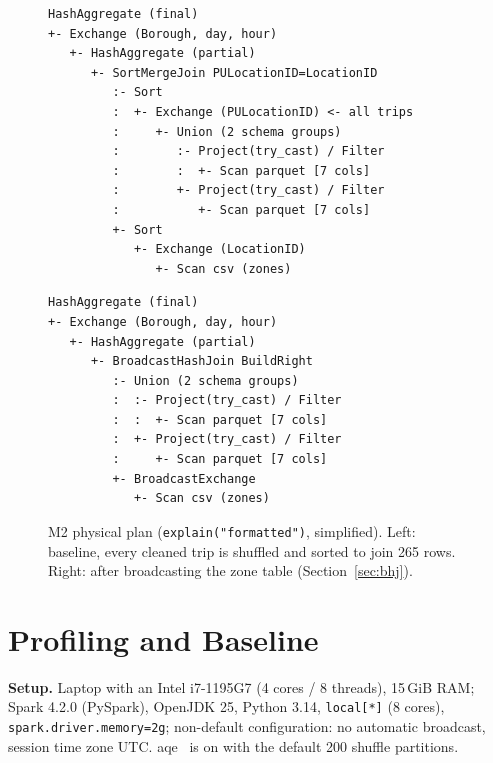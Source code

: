 \documentclass[sigconf]{acmart}
\begin{document}
\begin{figure}[t]
      \centering
      \begin{minipage}[t]{0.5\textwidth}
            \scriptsize \begin{verbatim}
HashAggregate (final)
+- Exchange (Borough, day, hour)
   +- HashAggregate (partial)
      +- SortMergeJoin PULocationID=LocationID
         :- Sort
         :  +- Exchange (PULocationID) <- all trips
         :     +- Union (2 schema groups)
         :        :- Project(try_cast) / Filter
         :        :  +- Scan parquet [7 cols]
         :        +- Project(try_cast) / Filter
         :           +- Scan parquet [7 cols]
         +- Sort
            +- Exchange (LocationID)
               +- Scan csv (zones)
\end{verbatim}
      \end{minipage}%
      \begin{minipage}[t]{0.47\textwidth}
            \scriptsize \begin{verbatim}
HashAggregate (final)
+- Exchange (Borough, day, hour)
   +- HashAggregate (partial)
      +- BroadcastHashJoin BuildRight
         :- Union (2 schema groups)
         :  :- Project(try_cast) / Filter
         :  :  +- Scan parquet [7 cols]
         :  +- Project(try_cast) / Filter
         :     +- Scan parquet [7 cols]
         +- BroadcastExchange
            +- Scan csv (zones)
\end{verbatim}
      \end{minipage}
      \caption{M2 physical plan (\texttt{explain("formatted")}, simplified). Left:
            baseline, every cleaned trip is shuffled and sorted to join 265 rows. Right:
            after broadcasting the zone table (Section~\ref{sec:bhj}).}
      \label{fig:plan}
\end{figure}

\section{Profiling and Baseline}
\label{sec:baseline}

\textbf{Setup.} Laptop with an Intel i7-1195G7 (4 cores / 8 threads), 15\,GiB
RAM; Spark 4.2.0 (PySpark), OpenJDK 25, Python 3.14, \texttt{local[*]} (8 cores),
\texttt{spark.driver.memory=2g}; non-default configuration: no automatic
broadcast, session time zone UTC. \gls{aqe}~\cite{spark-tuning} is on with the
default 200 shuffle partitions.
\end{document}
